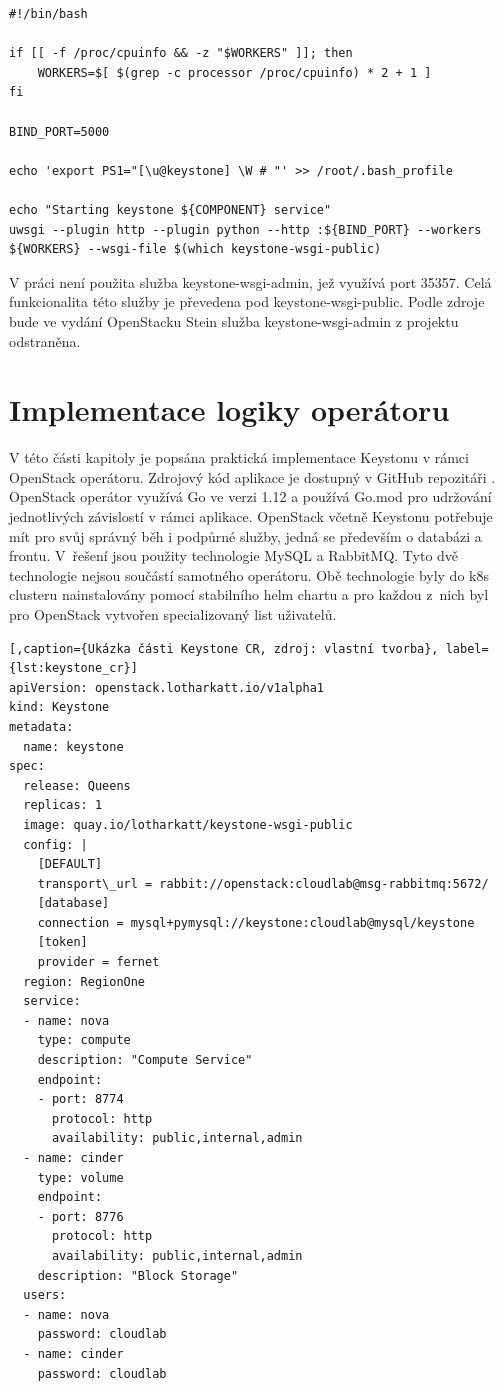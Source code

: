 \begin{lstlisting}[caption={Entrypoint pro Keystone image, zdroj: vlastní tvorba},label={lst:keystone_entryponit}]
#!/bin/bash

if [[ -f /proc/cpuinfo && -z "$WORKERS" ]]; then
    WORKERS=$[ $(grep -c processor /proc/cpuinfo) * 2 + 1 ]
fi

BIND_PORT=5000

echo 'export PS1="[\u@keystone] \W # "' >> /root/.bash_profile

echo "Starting keystone ${COMPONENT} service"
uwsgi --plugin http --plugin python --http :${BIND_PORT} --workers ${WORKERS} --wsgi-file $(which keystone-wsgi-public)
\end{lstlisting}

V práci není použita služba keystone-wsgi-admin, jež využívá port 35357. Celá funkcionalita této služby je převedena pod keystone-wsgi-public. Podle zdroje \cite{keystone-admin-dep} bude ve vydání OpenStacku Stein služba keystone-wsgi-admin z projektu odstraněna.

\section{Implementace logiky operátoru}
V této části kapitoly je popsána praktická implementace Keystonu v rámci OpenStack operátoru. Zdrojový kód aplikace je dostupný v GitHub repozitáři \cite{repo_openstack_operator}. OpenStack operátor využívá Go ve verzi 1.12 a používá Go.mod pro udržování jednotlivých závislostí v rámci aplikace. OpenStack včetně Keystonu potřebuje mít pro svůj správný běh i podpůrné služby, jedná se především o databázi a frontu. V řešení jsou použity technologie MySQL a RabbitMQ. Tyto dvě technologie nejsou součástí samotného operátoru. Obě technologie byly do k8s clusteru nainstalovány pomocí stabilního helm chartu a pro každou z nich byl pro OpenStack vytvořen specializovaný list uživatelů.

\begin{lstlisting}[,caption={Ukázka části Keystone CR, zdroj: vlastní tvorba}, label={lst:keystone_cr}]
apiVersion: openstack.lotharkatt.io/v1alpha1
kind: Keystone
metadata:
  name: keystone
spec:
  release: Queens
  replicas: 1
  image: quay.io/lotharkatt/keystone-wsgi-public
  config: |
    [DEFAULT]
    transport\_url = rabbit://openstack:cloudlab@msg-rabbitmq:5672/
    [database]
    connection = mysql+pymysql://keystone:cloudlab@mysql/keystone
    [token]
    provider = fernet
  region: RegionOne
  service:
  - name: nova
    type: compute
    description: "Compute Service"
    endpoint:
    - port: 8774
      protocol: http
      availability: public,internal,admin
  - name: cinder
    type: volume
    endpoint:
    - port: 8776
      protocol: http
      availability: public,internal,admin
    description: "Block Storage"
  users:
  - name: nova
    password: cloudlab
  - name: cinder
    password: cloudlab
\end{lstlisting}

